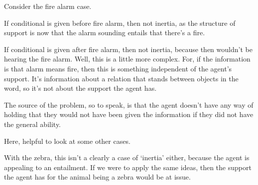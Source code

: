 \documentclass[10pt]{article}
\begin{document}
\begin{note}
  Consider the fire alarm case.

  If conditional is given before fire alarm, then not inertia, as the structure of support is now that the alarm sounding entails that there's a fire.

  If conditional is given after fire alarm, then not inertia, because then wouldn't be hearing the fire alarm.
  Well, this is a little more complex.
  For, if the information is that alarm means fire, then this is something independent of the agent's support.
  It's information about a relation that stands between objects in the word, so it's not about the support the agent has.

  The source of the problem, so to speak, is that the agent doesn't have any way of holding that they would not have been given the information if they did not have the general ability.
\end{note}

\begin{note}
  Here, helpful to look at some other cases.

  With the zebra, this isn't a clearly a case of `inertia' either, because the agent is appealing to an entailment.
  If we were to apply the same ideas, then the support the agent has for the animal being a zebra would be at issue.
  
\end{note}
\end{document}
